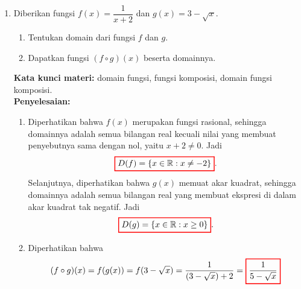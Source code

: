 \documentclass[10pt,openany,a4paper]{article}
\theoremstyle{definition}
\theoremstyle{definition}
\theoremstyle{plain}
\newenvironment{jawab}[2][tes]{%
\par\noindent\textbf{Kata kunci materi:} #1.\\
\textbf{Penyelesaian:} #2%
}{}
\begin{document}
\begin{enumerate}
\begin{jawab}[pertidaksamaan rasional, pertidaksamaan ganda, garis bilangan, irisan himpunan]
{\begin{enumerate}
        \end{enumerate}
        Himpunan penyelesaian pertidaksamaan ganda adalah irisan dari kedua himpunan tersebut, yaitu
        \begin{align*}
            HP_1\cap HP_2 = \big((0,1]\cup[2,\infty)\big)\cap\big((-\infty,0)\cup(1,\infty)\big) = [2,\infty).
        \end{align*}
        Sebagai pengecekan, untuk $x=2$ diperoleh $\frac{4+2}{2}=3$, dan berlaku $3\leq 3<4$. Jadi himpunan penyelesaiannya adalah $\colorlet{oldcolor}{.}
        \color{red}
        \setlength{\fboxrule}{1pt} \boxed{\color{oldcolor}\{x\in\mathbb{R} : x\geq 2\}=[2,\infty)}\color{oldcolor}$.
    }
    \end{jawab}

    \item Diberikan fungsi $f(x)=\dfrac{1}{x+2}$ dan $g(x)=3-\sqrt{x}$.
    \begin{enumerate}
        \item Tentukan domain dari fungsi $f$ dan $g$.
        \item Dapatkan fungsi $(f\circ g)(x)$ beserta domainnya.
    \end{enumerate}
    \begin{jawab}[domain fungsi, fungsi komposisi, domain fungsi komposisi]{
        \begin{enumerate}
            \item Diperhatikan bahwa $f(x)$ merupakan fungsi rasional, sehingga domainnya adalah semua bilangan real kecuali nilai yang membuat penyebutnya sama dengan nol, yaitu $x+2\neq 0$. Jadi
            \[
            \colorlet{oldcolor}{.}
        \color{red}
        \setlength{\fboxrule}{1pt} \boxed{\color{oldcolor}D(f)=\{x \in \mathbb{R} : x \neq -2\}}\color{oldcolor}.
            \]
            Selanjutnya, diperhatikan bahwa $g(x)$ memuat akar kuadrat, sehingga domainnya adalah semua bilangan real yang membuat ekspresi di dalam akar kuadrat tak negatif. Jadi
            \[
            \colorlet{oldcolor}{.}
        \color{red}
        \setlength{\fboxrule}{1pt} \boxed{\color{oldcolor}D(g)=\{x \in \mathbb{R} : x \geq 0\}}\color{oldcolor}.
            \]
            \item Diperhatikan bahwa
            \begin{align*}
                (f\circ g)(x) = f(g(x)) = f(3 - \sqrt{x}) = \frac{1}{(3 - \sqrt{x}) + 2} = \colorlet{oldcolor}{.}
        \color{red}
        \setlength{\fboxrule}{1pt} \boxed{\color{oldcolor}\frac{1}{5 - \sqrt{x}}}\color{oldcolor}

\end{align*}
\end{enumerate}}
\end{jawab}
\end{enumerate}
\end{document}
